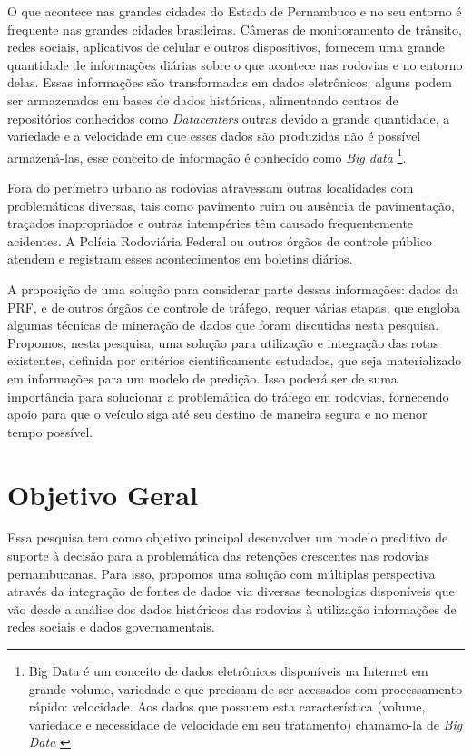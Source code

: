 O que acontece nas grandes cidades do Estado de Pernambuco e no seu entorno é frequente nas grandes cidades brasileiras.
Câmeras de monitoramento de trânsito, redes sociais, aplicativos de celular e outros dispositivos, fornecem uma grande quantidade de informações diárias sobre o que acontece nas rodovias e no entorno delas. Essas informações são transformadas em dados eletrônicos, alguns podem ser armazenados em bases de dados históricas, alimentando centros de repositórios conhecidos como \textit{Datacenters} outras devido a grande quantidade, a variedade e a velocidade em que esses dados são produzidas não é possível armazená-las, esse conceito de informação é conhecido como \textit{Big data} \footnote{Big Data é um conceito de dados eletrônicos disponíveis na Internet em grande volume, variedade e que precisam de ser acessados com processamento rápido: velocidade. Aos dados que possuem esta característica (volume, variedade e necessidade de velocidade em seu tratamento) chamamo-la de \textit{Big Data} \cite{bigdataQualquerUm} \cite{bigdataMedicina} }.

Fora do perímetro urbano as rodovias atravessam outras localidades com problemáticas diversas, tais como pavimento ruim ou ausência de pavimentação, 
traçados inapropriados e outras intempéries têm causado frequentemente acidentes.
A Polícia Rodoviária Federal ou outros órgãos de controle público atendem e registram esses acontecimentos em boletins diários.

A proposição de uma solução para considerar parte dessas informações: dados da PRF, e de outros órgãos de controle de tráfego, requer várias etapas, que engloba algumas técnicas de mineração de dados que foram discutidas nesta pesquisa.
Propomos, nesta pesquisa, uma solução para utilização e integração das rotas existentes, definida por critérios cientificamente estudados, que seja materializado em informações para um modelo de predição.
Isso poderá ser de suma importância para solucionar a problemática do tráfego em rodovias, fornecendo apoio para que o veículo siga até seu destino de maneira segura e no menor tempo possível.



\pagebreak
\section{ Objetivo Geral}\label{intro:objetivo}

Essa pesquisa tem como objetivo principal desenvolver um modelo preditivo de suporte à decisão para a problemática das retenções crescentes nas rodovias pernambucanas. 
Para isso, propomos uma solução com múltiplas perspectiva através da integração de fontes de dados via diversas tecnologias disponíveis que vão desde a análise dos dados históricos das 
rodovias à utilização informações de redes sociais e dados governamentais.

